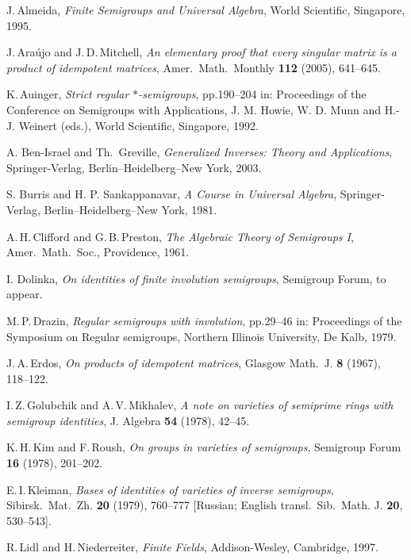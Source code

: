 \documentclass[11pt,reqno]{amsart}
\numberwithin{equation}{section}
\theoremstyle{remark}
\begin{document}
\begin{thebibliography}{99}

J.\,Almeida, \emph{Finite Semigroups and Universal Algebra}, World
Scientific, Singapore, 1995.

J.\,Ara\'ujo and J.\,D.\,Mitchell, \emph{An elementary proof that
every singular matrix is a product of idempotent matrices}, Amer.\
Math.\ Monthly \textbf{112} (2005), 641--645.

K.\,Auinger, \emph{Strict regular $*$-semigroups}, pp.190--204 in:
Proceedings of the Conference on Semigroups with Applications, J.
M. Howie, W. D. Munn and H.-J. Weinert (eds.), World Scientific,
Singapore, 1992.

A. Ben-Israel and Th.\ Greville, \emph{Generalized Inverses:
Theory and Applications}, Springer-Verlag, Berlin--Heidelberg--New
York, 2003.

S. Burris and H. P. Sankappanavar, \emph{A Course in Universal
Algebra}, Springer-Verlag, Berlin--Heidelberg--New York, 1981.

A.\,H.\,Clifford and G.\,B.\,Preston, \emph{The Algebraic Theory
of Semigroups I}, Amer.\ Math.\ Soc., Providence, 1961.

I. Dolinka, \emph{On identities of finite involution semigroups},
Semigroup Forum, to appear.

M.\,P.\,Drazin, \emph{Regular semigroups with involution},
pp.29--46 in: Proceedings of the Symposium on Regular semigroups,
Northern Illinois University, De Kalb, 1979.

J.\,A.\,Erdos, \emph{On products of idempotent matrices}, Glasgow
Math.\ J. \textbf{8} (1967), 118--122.

I.\,Z.\,Golubchik and A.\,V.\,Mikhalev, \emph{A note on varieties
of semiprime rings with semigroup identities}, J. Algebra
\textbf{54} (1978), 42--45.

K.\,H.\,Kim and F.\,Roush, \emph{On groups in varieties of
semigroups}, Semigroup Forum \textbf{ 16} (1978), 201--202.

E.\,I.\,Kleiman, \emph{Bases of identities of varieties of inverse
semigroups}, Sibirsk.\ Mat.\ Zh. \textbf{20} (1979), 760--777
[Russian; English transl.\ Sib.\ Math. J. \textbf{20}, 530--543].

R.\,Lidl and H.\,Niederreiter, \emph{Finite Fields},
Addison-Wesley, Cambridge, 1997.


\end{thebibliography}
\end{document}
